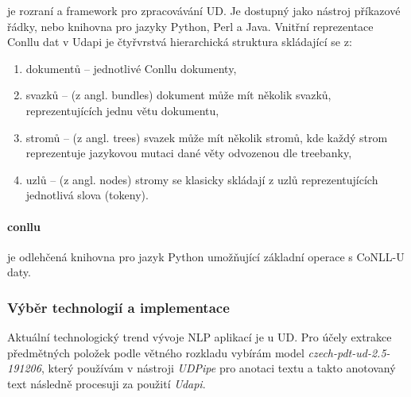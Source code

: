 \documentclass[thesis=M,czech]{FITthesis}[2019/12/23]
\begin{document}
je rozraní a framework pro zpracovávání UD\cite{Udapi}. Je dostupný jako nástroj příkazové řádky, nebo knihovna pro jazyky Python, Perl a Java. Vnitřní reprezentace Conllu dat v Udapi je čtyřvrstvá hierarchická struktura skládající se z:
\begin{enumerate}
    \item dokumentů -- jednotlivé Conllu dokumenty,
    \item svazků -- (z angl. bundles) dokument může mít několik svazků, reprezentujících jednu větu dokumentu,
    \item stromů -- (z angl. trees) svazek může mít několik stromů, kde každý strom reprezentuje jazykovou mutaci dané věty odvozenou dle treebanky,
    \item uzlů -- (z angl. nodes) stromy se klasicky skládají z uzlů reprezentujících jednotlivá slova (tokeny).
\end{enumerate}

\paragraph{conllu}

je odlehčená knihovna pro jazyk Python umožňující základní operace s CoNLL-U daty.

\subsubsection{Výběr technologií a implementace}
\label{sec:subj_conllu_extraction}

Aktuální technologický trend vývoje NLP aplikací je u UD. Pro účely extrakce předmětných položek podle větného rozkladu vybírám model \textit{czech-pdt-ud-2.5-191206}\cite{UD_Czech-PDT}, který používám v nástroji \textit{UDPipe} pro anotaci textu a takto anotovaný text následně procesuji za použití \textit{Udapi}.
\end{document}
